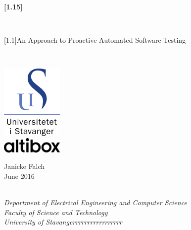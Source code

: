 \thispagestyle{empty}
\vspace*{2cm}
\begin{center}
    \scshape{
        \begin{Huge}\textbf{\scalebox{1}[1.15]{\toolname}}\end{Huge}\\
        \vspace{0.6cm}
        \begin{Large}\scalebox{1}[1.1]{An Approach to Proactive Automated Software Testing}\end{Large}\\
    }
    \vspace{2.6cm}
    \includegraphics[width=3cm]{figures/uis_logo}\\
    \vspace{0.8cm}
    \includegraphics[width=3cm]{figures/logo_pos_RGB}\\
    \vspace{1.6cm}
    \begin{large}Janicke Falch\\
    \vspace{0.2cm}
    June 2016\end{large}\\
    \vspace{1cm}
    \emph{
        Department of Electrical Engineering and Computer Science\\
        Faculty of Science and Technology\\
        University of Stavangerrrrrrrrrrrrrrrrr
    }
\end{center}